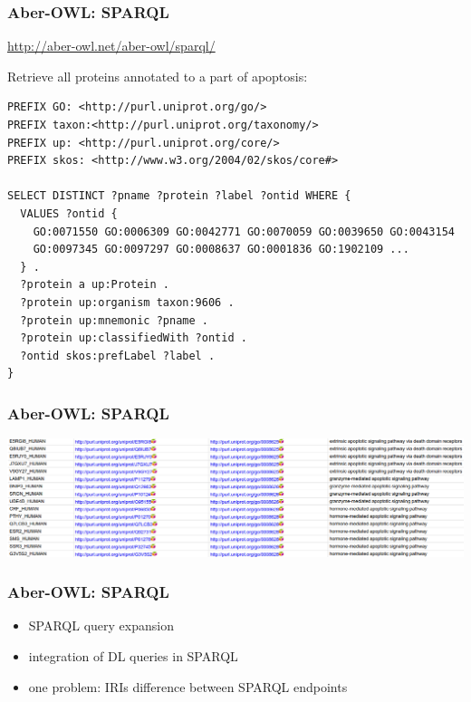 \documentclass{beamer}
\begin{document}
\begin{frame}[fragile]
  \frametitle{Aber-OWL: SPARQL}
  \centerline{\url{http://aber-owl.net/aber-owl/sparql/}}
  \vspace{1cm}
  Retrieve all proteins annotated to a part of apoptosis:
  {\tiny
\begin{verbatim}
PREFIX GO: <http://purl.uniprot.org/go/>
PREFIX taxon:<http://purl.uniprot.org/taxonomy/>
PREFIX up: <http://purl.uniprot.org/core/>
PREFIX skos: <http://www.w3.org/2004/02/skos/core#>

SELECT DISTINCT ?pname ?protein ?label ?ontid WHERE { 
  VALUES ?ontid { 
    GO:0071550 GO:0006309 GO:0042771 GO:0070059 GO:0039650 GO:0043154
    GO:0097345 GO:0097297 GO:0008637 GO:0001836 GO:1902109 ...
  } . 
  ?protein a up:Protein .
  ?protein up:organism taxon:9606 .
  ?protein up:mnemonic ?pname .
  ?protein up:classifiedWith ?ontid .
  ?ontid skos:prefLabel ?label .
}
\end{verbatim}
}
\end{frame}

\begin{frame}
  \frametitle{Aber-OWL: SPARQL}
  \centerline{\includegraphics[width=1.1\textwidth]{uniprot-aber.png}}
\end{frame}

\begin{frame}
  \frametitle{Aber-OWL: SPARQL}
  \begin{itemize}
  \item SPARQL query expansion
  \item integration of DL queries in SPARQL
  \item one problem: IRIs difference between SPARQL endpoints
  \end{itemize}
\end{frame}
\end{document}
